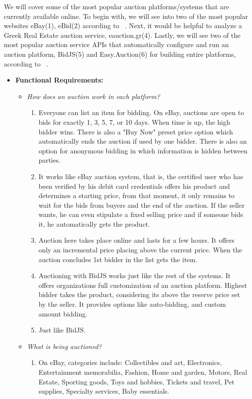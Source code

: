 \documentclass[letterpaper,twocolumn,10pt]{article}
\begin{document}
We will cover some of the most popular auction platforms/systems that are currently available online. To begin with, we will see into two of the most popular websites eBay(1), eBid(2) according to ~\cite{Websites}. Next, it would be helpful to analyze a Greek Real Estate auction service, eauction.gr(4). Lastly, we will see two of the most popular auction service APIs that automatically configure and run an auction platform, BidJS(5) and Easy.Auction(6) for building entire platforms, according to ~\cite{AuctionServices}. 
\begin{itemize}
\item \textbf{Functional Requirements:}
\begin{itemize}
\item \emph{How does an auction work in each platform?}
    \begin{enumerate}
    \item Everyone can list an item for bidding. On eBay, auctions are open to bids for exactly 1, 3, 5, 7, or 10 days. When time is up, the high bidder wins. There is also a "Buy Now" preset price option which automatically ends the auction if used by one bidder. There is also an option for anonymous bidding in which information is hidden between parties.
    \item It works like eBay auction system, that is, the certified user who has been verified by his debit card credentials offers his product and determines a starting price, from that moment, it only remains to wait for the bids from buyers and the end of the auction. If the seller wants, he can even stipulate a fixed selling price and if someone bids it, he automatically gets the product. 
    \item Auction here takes place online and lasts for a few hours. It offers only an incremental price placing above the current price. When the auction concludes 1st bidder in the list gets the item.
    \item Auctioning with BidJS works just like the rest of the systems. It offers organizations full customization of an auction platform. Highest bidder takes the product, considering its above the reserve price set by the seller. It provides options like auto-bidding, and custom amount bidding.
    \item Just like BidJS.
    \end{enumerate}
\item \emph{What is being auctioned?}
    \begin{enumerate}
    \item On eBay, categories include: Collectibles and art, Electronics, Entertainment memorabilia, Fashion, Home and garden, Motors, Real Estate, Sporting goods, Toys and hobbies, Tickets and travel, Pet supplies, Specialty services, Baby essentials.

\end{enumerate}
\end{itemize}
\end{itemize}
\end{document}
